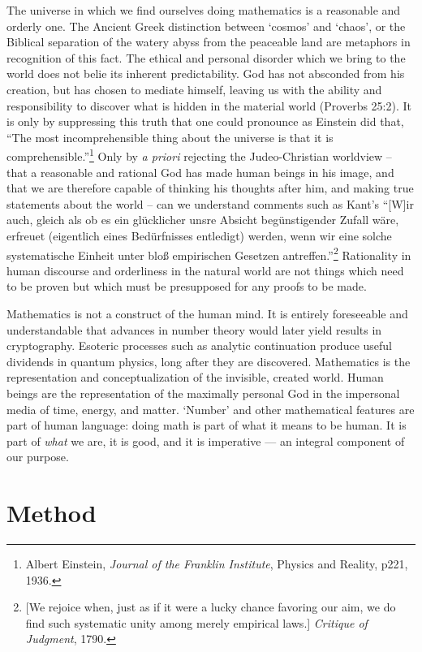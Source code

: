 The universe in which we find ourselves doing mathematics is a 
reasonable and orderly one.  The Ancient Greek distinction between `cosmos' 
and `chaos', or the Biblical separation of the watery abyss from the peaceable land are
metaphors in recognition of this fact.  The ethical and personal disorder which we bring to the world
does not belie its inherent predictability.  
God has not absconded from his creation, but has
chosen to mediate himself, leaving us with the ability and responsibility to discover
what is hidden in the material world (Proverbs 25:2).  It is only by suppressing this truth that one could
pronounce as Einstein did that, ``The most incomprehensible thing about the universe 
is that it is comprehensible.''\footnote{Albert Einstein, 
\emph{Journal of the Franklin Institute}, Physics and Reality, p221, 1936.}
Only by \textit{a priori} rejecting the Judeo-Christian worldview -- that a reasonable and rational God
has made human beings in his image, and that we are therefore capable of thinking his thoughts
after him, and making true statements about the world -- can we understand comments such 
as Kant's ``[W]ir auch, gleich als ob es ein glücklicher unsre Absicht begünstigender Zufall wäre, 
erfreuet (eigentlich eines Bedürfnisses entledigt) werden, wenn wir eine solche systematische 
Einheit unter bloß empirischen Gesetzen antreffen.''\footnote{
[We rejoice when, just as if it were a lucky chance favoring 
our aim, we do find such systematic unity among merely empirical laws.] \textit{Critique of Judgment}, 1790.}
Rationality in human discourse and orderliness in the natural world are not things
which need to be proven but which must be presupposed for any proofs to be made.

Mathematics is not a construct of the human mind.  It is entirely foreseeable and 
understandable that advances in number theory would later yield results in cryptography.
Esoteric processes such as analytic continuation produce useful dividends in
quantum physics, long after they are discovered.  Mathematics is the representation
and conceptualization of the invisible, created world.  Human beings are the representation
of the maximally personal God in the impersonal media of time, energy, and matter. 
`Number' and other mathematical features are part of human language:
doing math is part of what it means to be human.  It is part of \emph{what} we are,
it is good, and it is imperative --- an integral component of our purpose.

\section{Method}

